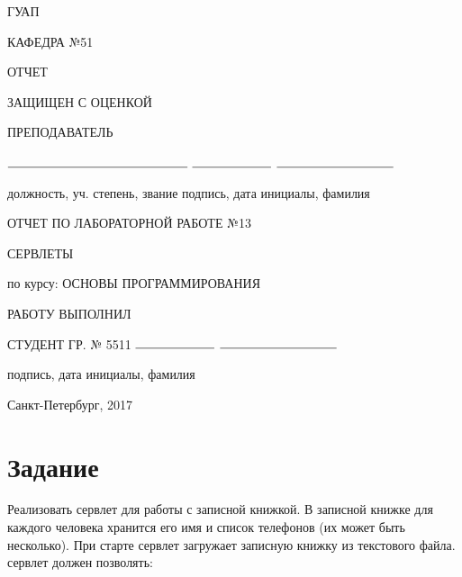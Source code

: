 \documentclass{article}
\begin{document}
\begin{titlepage}
	\begin{center}
    	ГУАП
    	\vspace{0.25cm}

    	КАФЕДРА №51
	\end{center}

    \begin{flushleft}

    	ОТЧЕТ

    	ЗАЩИЩЕН С ОЦЕНКОЙ

		ПРЕПОДАВАТЕЛЬ 


    	\vspace{0.5cm} 

		$\rule{5cm}{0.15mm}$ \hfill $\rule{2.2cm}{0.15mm}$  \hfill $\rule{3.25cm}{0.15mm}$

		должность, уч. степень, звание \hfill подпись, дата \hfill инициалы, фамилия
    \end{flushleft}
    
 	
    \hspace{2cm}

	\begin{center}
    	ОТЧЕТ ПО ЛАБОРАТОРНОЙ РАБОТЕ №13


    	\vspace{1cm}

    	СЕРВЛЕТЫ


    	\vspace{1cm}

    	по курсу: ОСНОВЫ ПРОГРАММИРОВАНИЯ {\MakeUppercase{}}
    \end{center}

    \vspace{3cm}

    \begin{flushleft}
    	РАБОТУ ВЫПОЛНИЛ

    	СТУДЕНТ ГР. № 5511 \hfill $\rule{2.2cm}{0.15mm}$  \hfill $\rule{3.25cm}{0.15mm}$

    	\hspace{7.8cm} подпись, дата \hfill инициалы, фамилия
    \end{flushleft}

	\vspace{5cm}   
	\begin{center}
 		Санкт-Петербург, 2017
	\end{center}
\end{titlepage}

\section{Задание}
Реализовать сервлет для работы с записной книжкой. В записной книжке для каждого человека хранится его имя и список телефонов (их может быть несколько). При старте сервлет загружает записную книжку из текстового файла. сервлет должен позволять:
\end{document}
